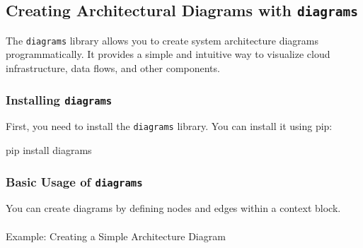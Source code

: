 \documentclass[
  letterpaper,
  DIV=11,
  numbers=noendperiod]{scrreprt}
\makeatletter
\let\oldparagraph\paragraph
\renewcommand{\paragraph}{
    \@ifstar
      \xxxParagraphStar
      \xxxParagraphNoStar
  }
\newcommand{\xxxParagraphStar}[1]{\oldparagraph*{#1}\mbox{}}
\newcommand{\xxxParagraphNoStar}[1]{\oldparagraph{#1}\mbox{}}
\newenvironment{Shaded}{\begin{snugshade}}{\end{snugshade}}
\newcommand{\ExtensionTok}[1]{\textcolor[rgb]{0.00,0.23,0.31}{#1}}
\newcommand{\NormalTok}[1]{\textcolor[rgb]{0.00,0.23,0.31}{#1}}
\makeatother
\begin{document}
\subsection{\texorpdfstring{Creating Architectural Diagrams with
\texttt{diagrams}}{Creating Architectural Diagrams with diagrams}}\label{creating-architectural-diagrams-with-diagrams}

The \texttt{diagrams} library allows you to create system architecture
diagrams programmatically. It provides a simple and intuitive way to
visualize cloud infrastructure, data flows, and other components.

\subsubsection{\texorpdfstring{Installing
\texttt{diagrams}}{Installing diagrams}}\label{installing-diagrams}

First, you need to install the \texttt{diagrams} library. You can
install it using pip:

\begin{Shaded}
\begin{Highlighting}[]
\ExtensionTok{pip}\NormalTok{ install diagrams}
\end{Highlighting}
\end{Shaded}

\subsubsection{\texorpdfstring{Basic Usage of
\texttt{diagrams}}{Basic Usage of diagrams}}\label{basic-usage-of-diagrams}

You can create diagrams by defining nodes and edges within a context
block.

\paragraph{Example: Creating a Simple Architecture
Diagram}\label{example-creating-a-simple-architecture-diagram}
\end{document}
